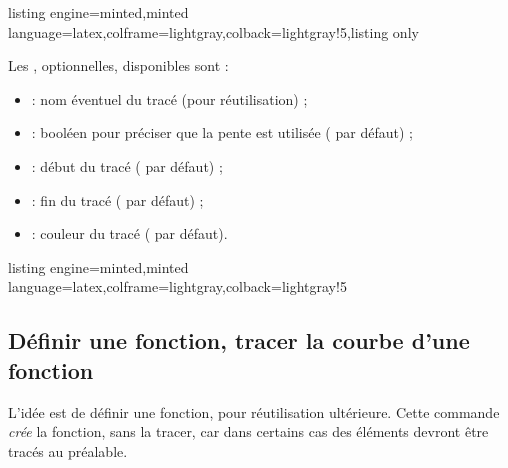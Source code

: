 \documentclass[11pt,a4paper]{ltxdoc}
\begin{document}
\begin{tcblisting}{listing engine=minted,minted language=latex,colframe=lightgray,colback=lightgray!5,listing only}
\end{tcblisting}

Les \MontreCode{[clés]}, optionnelles, disponibles sont :

\smallskip

\begin{itemize}
	\item {} : nom éventuel du tracé (pour réutilisation) ;
	\item {} : booléen pour préciser que la pente est utilisée ( par défaut) ;
	\item {} : début du tracé ( par défaut) ;
	\item {} : fin du tracé ( par défaut) ;
	\item {} : couleur du tracé ( par défaut).
\end{itemize}

\begin{tcblisting}{listing engine=minted,minted language=latex,colframe=lightgray,colback=lightgray!5}
\begin{GraphiqueTikz}%
	[x=0.8cm,y=1cm,Xmin=-7,Xmax=4,Ymin=-3,Ymax=5]
\end{GraphiqueTikz}
\end{tcblisting}

\pagebreak

\subsection{Définir une fonction, tracer la courbe d'une fonction}\label{deftracfct}

L'idée est de définir une fonction, pour réutilisation ultérieure. Cette commande \textit{crée} la fonction, sans la tracer, car dans certains cas des éléments devront être tracés au préalable.

\smallskip
\end{document}
